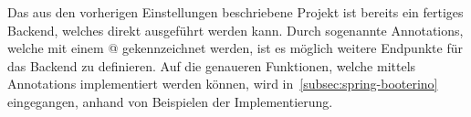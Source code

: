 Das aus den vorherigen Einstellungen beschriebene Projekt ist bereits ein fertiges Backend, welches direkt ausgeführt werden kann.
Durch sogenannte Annotations, welche mit einem @ gekennzeichnet werden, ist es möglich weitere Endpunkte für das Backend zu definieren.
Auf die genaueren Funktionen, welche mittels Annotations implementiert werden können, wird in~\ref{subsec:spring-booterino} eingegangen, anhand von Beispielen der Implementierung.

